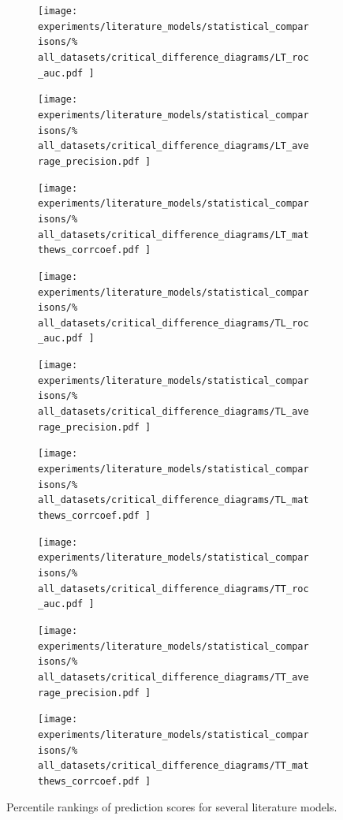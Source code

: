 \begin{figure}
    \centering
    \begin{subfigure}{0.32\textwidth}
        \texttt{[image: 
            experiments/literature\_models/statistical\_comparisons/\%
            all\_datasets/critical\_difference\_diagrams/LT\_roc\_auc.pdf
        ]}
    \end{subfigure}
    \begin{subfigure}{0.32\textwidth}
        \texttt{[image: 
            experiments/literature\_models/statistical\_comparisons/\%
            all\_datasets/critical\_difference\_diagrams/LT\_average\_precision.pdf
        ]}
    \end{subfigure}
    \begin{subfigure}{0.32\textwidth}
        \texttt{[image: 
            experiments/literature\_models/statistical\_comparisons/\%
            all\_datasets/critical\_difference\_diagrams/LT\_matthews\_corrcoef.pdf
        ]}
    \end{subfigure}

    \begin{subfigure}{0.32\textwidth}
        \texttt{[image: 
            experiments/literature\_models/statistical\_comparisons/\%
            all\_datasets/critical\_difference\_diagrams/TL\_roc\_auc.pdf
        ]}
    \end{subfigure}
    \begin{subfigure}{0.32\textwidth}
        \texttt{[image: 
            experiments/literature\_models/statistical\_comparisons/\%
            all\_datasets/critical\_difference\_diagrams/TL\_average\_precision.pdf
        ]}
    \end{subfigure}
    \begin{subfigure}{0.32\textwidth}
        \texttt{[image: 
            experiments/literature\_models/statistical\_comparisons/\%
            all\_datasets/critical\_difference\_diagrams/TL\_matthews\_corrcoef.pdf
        ]}
    \end{subfigure}

    \begin{subfigure}{0.32\textwidth}
        \texttt{[image: 
            experiments/literature\_models/statistical\_comparisons/\%
            all\_datasets/critical\_difference\_diagrams/TT\_roc\_auc.pdf
        ]}
    \end{subfigure}
    \begin{subfigure}{0.32\textwidth}
        \texttt{[image: 
            experiments/literature\_models/statistical\_comparisons/\%
            all\_datasets/critical\_difference\_diagrams/TT\_average\_precision.pdf
        ]}
    \end{subfigure}
    \begin{subfigure}{0.32\textwidth}
        \texttt{[image: 
            experiments/literature\_models/statistical\_comparisons/\%
            all\_datasets/critical\_difference\_diagrams/TT\_matthews\_corrcoef.pdf
        ]}
    \end{subfigure}
    \caption{Percentile rankings of prediction scores for several literature models.}
    \label{fig:cdd_literature}
\end{figure}



